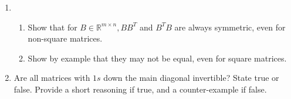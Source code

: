 \begin{enumerate}
\begin{enumerate}
    \item \begin{enumerate} 
        \item Show that for $B\in\mathbb{R}^{m\times n}, $\(BB^T\) and \(B^{T}B\) are always symmetric, even for non-square matrices.
        \item Show by example that they may not be equal, even for square matrices.
     \end{enumerate}

    \item Are all matrices with \(1s\) down the main diagonal invertible? State true or false. Provide a short reasoning if true, and a counter-example if false. 

\end{enumerate}
\end{enumerate}